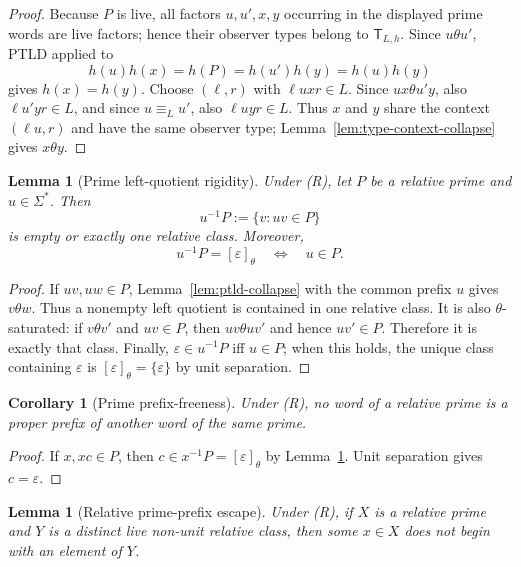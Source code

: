 \documentclass[11pt,a4paper]{article}
\newtheorem{lemma}[theorem]{Lemma}
\newtheorem{corollary}[theorem]{Corollary}
\newcommand{\eps}{\varepsilon}
\begin{document}
\begin{proof}
Because $P$ is live, all factors $u,u',x,y$ occurring in the displayed prime words are live factors; hence their observer types belong to $\mathsf T_{L,h}$.  Since $u\theta u'$, PTLD applied to
\[
  h(u)h(x)=h(P)=h(u')h(y)=h(u)h(y)
\]
gives $h(x)=h(y)$.  Choose $(\ell,r)$ with $\ell uxr\in L$.  Since $ux\theta u'y$, also $\ell u'yr\in L$, and since $u\equiv_Lu'$, also $\ell uyr\in L$.  Thus $x$ and $y$ share the context $(\ell u,r)$ and have the same observer type; Lemma~\ref{lem:type-context-collapse} gives $x\theta y$.
\end{proof}

\begin{lemma}[Prime left-quotient rigidity]
\label{lem:prime-left-quotient-rigidity}
Under \textup{(R)}, let $P$ be a relative prime and $u\in\Sigma^*$.  Then
\[
  u^{-1}P:=\{v:uv\in P\}
\]
is empty or exactly one relative class.  Moreover,
\[
  u^{-1}P=[\eps]_\theta
  \quad\Longleftrightarrow\quad
  u\in P.
\]
\end{lemma}

\begin{proof}
If $uv,uw\in P$, Lemma~\ref{lem:ptld-collapse} with the common prefix $u$ gives $v\theta w$.  Thus a nonempty left quotient is contained in one relative class.  It is also $\theta$-saturated: if $v\theta v'$ and $uv\in P$, then $uv\theta uv'$ and hence $uv'\in P$.  Therefore it is exactly that class.  Finally, $\eps\in u^{-1}P$ iff $u\in P$; when this holds, the unique class containing $\eps$ is $[\eps]_\theta=\{\eps\}$ by unit separation.
\end{proof}

\begin{corollary}[Prime prefix-freeness]
\label{cor:prime-prefix-free}
Under \textup{(R)}, no word of a relative prime is a proper prefix of another word of the same prime.
\end{corollary}

\begin{proof}
If $x,xc\in P$, then $c\in x^{-1}P=[\eps]_\theta$ by Lemma~\ref{lem:prime-left-quotient-rigidity}.  Unit separation gives $c=\eps$.
\end{proof}

\begin{lemma}[Relative prime-prefix escape]
\label{lem:relative-prefix-escape}
Under \textup{(R)}, if $X$ is a relative prime and $Y$ is a distinct live non-unit relative class, then some $x\in X$ does not begin with an element of $Y$.
\end{lemma}
\end{document}
